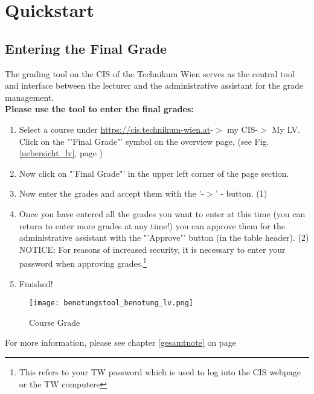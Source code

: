\section{Quickstart}
\label{quickstart}

\subsection{Entering the Final Grade}

The grading tool on the CIS of the Technikum Wien serves as the central tool and interface between the lecturer and the administrative assistant for the grade management.\\

\noindent
{\bf Please use the tool to enter the final grades:}

\begin{enumerate}
\item Select a course under \url{https://cis.technikum-wien.at}-$>$ my CIS-$>$ My LV. Click on the "'Final Grade"' symbol on the overview page, (see Fig. \ref{uebersicht_lv}, page \pageref{uebersicht_lv})
\item Now click on "'Final Grade"' in the upper left corner of the page section.
\item Now enter the grades and accept them with the '-$>$' - button.
(1)
\item Once you have entered all the grades you want to enter at this time (you can return to enter more grades at any time!) you can approve them for the administrative assistant with the "'Approve"' button (in the table header).
(2)\\ 
NOTICE: For reasons of increased security, it is necessary to enter your password when approving grades.\footnote{This refers to your TW password which is used to log into the CIS webpage or the TW computers}
\item Finished!
\end{enumerate}


\begin{figure}[ht]
\begin{center}
\texttt{[image: benotungstool\_benotung\_lv.png]}
\end{center}
\caption{Course Grade}\label{benotung_lv_quick}
\end{figure}

\noindent
For more information, please see chapter \ref{gesamtnote} on page \pageref{gesamtnote}\\

